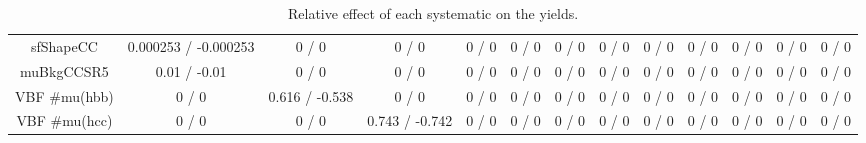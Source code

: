 \documentclass[10pt]{article}
\begin{document}
\begin{table}[htbp]
\begin{center}
\begin{tabular}{|c|c|c|c|c|c|c|c|c|c|c|c|c|}
  sfShapeCC & 0.000253 / -0.000253 & 0 / 0 & 0 / 0 & 0 / 0 & 0 / 0 & 0 / 0 & 0 / 0 & 0 / 0 & 0 / 0 & 0 / 0 & 0 / 0 & 0 / 0 \\ 
  muBkgCCSR5 & 0.01 / -0.01 & 0 / 0 & 0 / 0 & 0 / 0 & 0 / 0 & 0 / 0 & 0 / 0 & 0 / 0 & 0 / 0 & 0 / 0 & 0 / 0 & 0 / 0 \\ 
  VBF #mu(hbb) & 0 / 0 & 0.616 / -0.538 & 0 / 0 & 0 / 0 & 0 / 0 & 0 / 0 & 0 / 0 & 0 / 0 & 0 / 0 & 0 / 0 & 0 / 0 & 0 / 0 \\ 
  VBF #mu(hcc) & 0 / 0 & 0 / 0 & 0.743 / -0.742 & 0 / 0 & 0 / 0 & 0 / 0 & 0 / 0 & 0 / 0 & 0 / 0 & 0 / 0 & 0 / 0 & 0 / 0 \\ 
\hline 
\end{tabular} 
\caption{Relative effect of each systematic on the yields.} 
\end{center} 
\end{table} 
\end{document}
